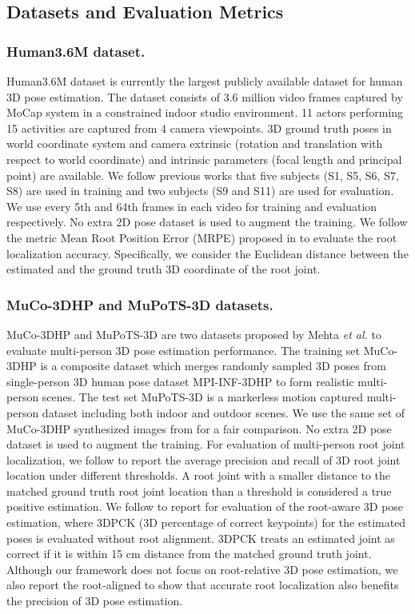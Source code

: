 \documentclass[runningheads]{llncs}
\begin{document}
\subsection{Datasets and Evaluation Metrics}

\subsubsection{Human3.6M dataset.}
Human3.6M dataset \cite{ionescu2014human3} is currently the largest publicly available dataset for human 3D pose estimation. The dataset consists of 3.6 million video frames captured by MoCap system in a constrained indoor studio environment. 11 actors performing 15 activities are captured from 4 camera viewpoints. 3D ground truth poses in world coordinate system and camera extrinsic (rotation and translation with respect to world coordinate) and intrinsic parameters (focal length and principal point) are available. We follow previous works that five subjects (S1, S5, S6, S7, S8) are used in training and two subjects (S9 and S11) are used for evaluation. We use every 5th and 64th frames in each video for training and evaluation respectively. No extra 2D pose dataset is used to augment the training. We follow the metric Mean Root Position Error (MRPE) proposed in \cite{Moon_2019_ICCV_3DMPPE}
to evaluate the root localization accuracy. 
Specifically, we consider the Euclidean distance between the estimated and the ground truth 3D coordinate of the root joint.

\subsubsection{MuCo-3DHP and MuPoTS-3D datasets.}
MuCo-3DHP and MuPoTS-3D are two datasets proposed by Mehta \textit{et al.} \cite{singleshotmultiperson2018} to evaluate multi-person 3D pose estimation performance. The training set MuCo-3DHP is a composite dataset which merges randomly sampled 3D poses from single-person 3D human pose dataset MPI-INF-3DHP \cite{mono-3dhp2017} to form realistic multi-person scenes. The test set MuPoTS-3D is a markerless motion captured multi-person dataset including both indoor and outdoor scenes. We use the same set of MuCo-3DHP synthesized images from \cite{Moon_2019_ICCV_3DMPPE} for a fair comparison. No extra 2D pose dataset is used to augment the training.
For evaluation of multi-person root joint localization, we follow \cite{Moon_2019_ICCV_3DMPPE} to report the average precision and recall of 3D root joint location under different thresholds. A root joint with a smaller distance to the matched ground truth root joint location than a threshold is considered a true positive estimation.
We follow \cite{Moon_2019_ICCV_3DMPPE} to report 
for evaluation of the root-aware 3D pose estimation,
where 3DPCK (3D percentage of correct keypoints) for the estimated poses is evaluated without root alignment.
3DPCK treats an estimated joint as correct if it is within 15 cm distance from the matched ground truth joint.
Although our framework does not focus on root-relative 3D pose estimation, we also report the root-aligned  to show that accurate root localization also benefits the precision of 3D pose estimation.
\end{document}
